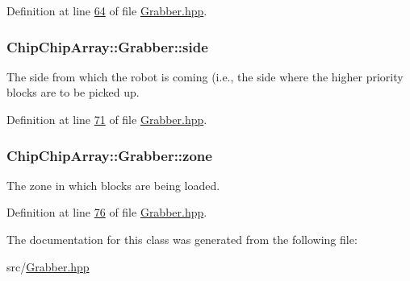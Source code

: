 Definition at line \hyperlink{Grabber_8hpp_source_l00064}{64} of file \hyperlink{Grabber_8hpp_source}{Grabber.\+hpp}.

\hypertarget{classChipChipArray_1_1Grabber_a8afbaefae7c767c862fd1bf13968539b}{
\subsubsection[{side}]{ Chip\+Chip\+Array\+::\+Grabber\+::side\hspace{0.3cm}{\ttfamily [protected]}}}\label{classChipChipArray_1_1Grabber_a8afbaefae7c767c862fd1bf13968539b}
The side from which the robot is coming (i.\+e., the side where the higher priority blocks are to be picked up. 

Definition at line \hyperlink{Grabber_8hpp_source_l00071}{71} of file \hyperlink{Grabber_8hpp_source}{Grabber.\+hpp}.

\hypertarget{classChipChipArray_1_1Grabber_ab57efe6e0b6f369b19528285a278d967}{
\subsubsection[{zone}]{ Chip\+Chip\+Array\+::\+Grabber\+::zone\hspace{0.3cm}{\ttfamily [protected]}}}\label{classChipChipArray_1_1Grabber_ab57efe6e0b6f369b19528285a278d967}
The zone in which blocks are being loaded. 

Definition at line \hyperlink{Grabber_8hpp_source_l00076}{76} of file \hyperlink{Grabber_8hpp_source}{Grabber.\+hpp}.



The documentation for this class was generated from the following file\+:\begin{DoxyCompactItemize}
\item 
src/\hyperlink{Grabber_8hpp}{Grabber.\+hpp}\end{DoxyCompactItemize}
